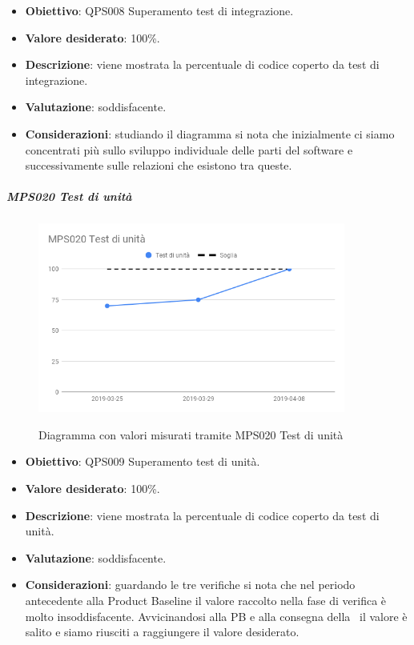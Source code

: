     \begin{itemize}
        \item \textbf{Obiettivo}: QPS008 Superamento test di integrazione.
        \item \textbf{Valore desiderato}: 100\%.
        \item \textbf{Descrizione}: viene mostrata la percentuale di codice coperto da test di integrazione.
        \item \textbf{Valutazione}: soddisfacente.
        \item \textbf{Considerazioni}: studiando il diagramma si nota che inizialmente ci siamo concentrati più sullo sviluppo individuale delle parti del
        software e successivamente sulle relazioni che esistono tra queste.
    \end{itemize}

       \subparagraph{MPS020 Test di unità}
   
   \begin{figure}[H]
       \centering
       \includegraphics[width=0.9\textwidth]{img/cruscotti/RQ/MPS020.png}
       \label{immagineTestunitaRQ}
       \caption{Diagramma con valori misurati tramite MPS020 Test di unità}
   \end{figure}
   
   \begin{itemize}
       \item \textbf{Obiettivo}: QPS009 Superamento test di unità.
       \item \textbf{Valore desiderato}: 100\%.
       \item \textbf{Descrizione}: viene mostrata la percentuale di codice coperto da test di unità.
       \item \textbf{Valutazione}: soddisfacente.
       \item \textbf{Considerazioni}: guardando le tre verifiche si nota che nel periodo antecedente alla Product Baseline il valore raccolto nella fase di
       verifica è molto insoddisfacente. Avvicinandosi alla PB e alla consegna della \RQ\ il valore è salito e siamo riusciti a raggiungere il valore desiderato.
   \end{itemize}
    
